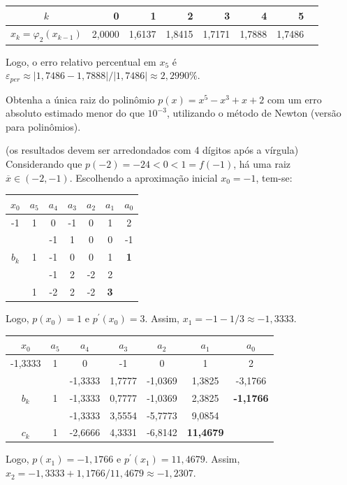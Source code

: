 \documentclass[12pt,a4paper]{article}
\begin{document}
\begin{ExerciseList}
\begin{enumerate}
\begin{center}
\begin{tabular}{|c|r|r|r|r|r|r|r|}
\hline
$k$   & 0      & 1      & 2      & 3      & 4      & 5 \\ \hline
$x_k = \varphi_2(x_{k-1})$ & 2,0000 & 1,6137 & 1,8415 & 1,7171 & 1,7888 & 1,7486 \\ \hline
\end{tabular}
\end{center}
Logo, o erro relativo percentual em $x_5$ é $\varepsilon_{per} \approx |1,7486 - 1,7888 |/|1,7486| \approx 2,2990\%$.
\end{enumerate}

\Exercise[title={2,5}] Obtenha a única raiz do polinômio $p(x) = x^5-x^3+x+2$ com um erro absoluto estimado menor do que $10^{-3}$, utilizando o método de Newton (versão para polinômios).

(os resultados devem ser arredondados com 4 dígitos após a vírgula)
\Answer Considerando que $p(-2) = -24 < 0 < 1 = f(-1)$, há uma raiz $\overline{x} \in (-2, -1)$. Escolhendo a aproximação inicial $x_0 = -1$, tem-se:
\begin{center}
\begin{tabular}{|c|c|c|c|c|c|c|}
\hline 
$x_0$ & $a_5$ & $a_4$ & $a_3$ & $a_2$ & $a_1$ & $a_0$ \\ 
\hline 
-1 & 1 &  0 & -1 &  0 & 1 &  2 \\ 
\hline 
   &   & -1 &  1 &  0 & 0 & -1 \\ 
\hline 
$b_k$  &  1 & -1 &  0 & 0 & 1 & \textbf{1} \\ 
\hline 
   &   & -1 &  2 & -2 & 2 & \\ 
\hline 
   & 1 & -2 &  2 & -2 & \textbf{3} & \\ 
\hline 
\end{tabular}
\end{center}
Logo, $p(x_0) = 1$ e $p^\prime(x_0) = 3$. Assim, $x_1 = -1 - 1/3 \approx -1,3333$.

\begin{center}
\begin{tabular}{|c|c|c|c|c|c|c|}
\hline 
$x_0$ & $a_5$ & $a_4$ & $a_3$ & $a_2$ & $a_1$ & $a_0$ \\ 
\hline 
-1,3333 & 1 & 0 & -1 & 0 & 1 & 2 \\ 
\hline 
 &   & -1,3333 & 1,7777 & -1,0369 & 1,3825 & -3,1766 \\ 
\hline 
$b_k$ & 1 & -1,3333 & 0,7777 & -1,0369 & 2,3825 & \textbf{-1,1766} \\ 
\hline 
 &   & -1,3333 & 3,5554 & -5,7773 & 9,0854 &   \\ 
\hline 
$c_k$ & 1 & -2,6666 & 4,3331 & -6,8142 & \textbf{11,4679} & \\ 
\hline 
\end{tabular}
\end{center}
Logo, $p(x_1) = -1,1766$ e $p^\prime(x_1) = 11,4679$. Assim, $x_2 = -1,3333 +1,1766/11,4679 \approx -1,2307$.


\end{ExerciseList}
\end{document}
